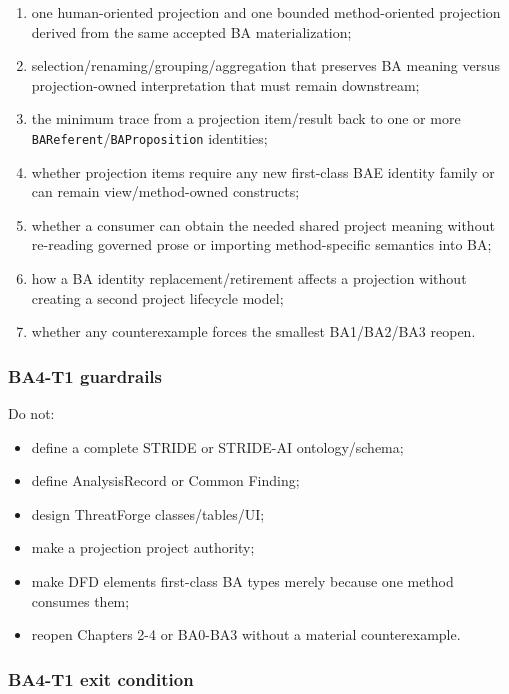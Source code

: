 \documentclass[11pt,a4paper]{article}
\providecommand{\tightlist}{\setlength{\itemsep}{0pt}\setlength{\parskip}{0pt}}
\begin{document}
\begin{enumerate}
\def\labelenumi{\arabic{enumi}.}
\tightlist
\item
  one human-oriented projection and one bounded method-oriented projection derived from the same accepted BA materialization;
\item
  selection/renaming/grouping/aggregation that preserves BA meaning versus projection-owned interpretation that must remain downstream;
\item
  the minimum trace from a projection item/result back to one or more \texttt{BAReferent}/\texttt{BAProposition} identities;
\item
  whether projection items require any new first-class BAE identity family or can remain view/method-owned constructs;
\item
  whether a consumer can obtain the needed shared project meaning without re-reading governed prose or importing method-specific semantics into BA;
\item
  how a BA identity replacement/retirement affects a projection without creating a second project lifecycle model;
\item
  whether any counterexample forces the smallest BA1/BA2/BA3 reopen.
\end{enumerate}

\subsubsection{BA4-T1 guardrails}\label{ba4-t1-guardrails}

Do not:

\begin{itemize}
\tightlist
\item
  define a complete STRIDE or STRIDE-AI ontology/schema;
\item
  define AnalysisRecord or Common Finding;
\item
  design ThreatForge classes/tables/UI;
\item
  make a projection project authority;
\item
  make DFD elements first-class BA types merely because one method consumes them;
\item
  reopen Chapters 2-4 or BA0-BA3 without a material counterexample.
\end{itemize}

\subsubsection{BA4-T1 exit condition}\label{ba4-t1-exit-condition}
\end{document}
